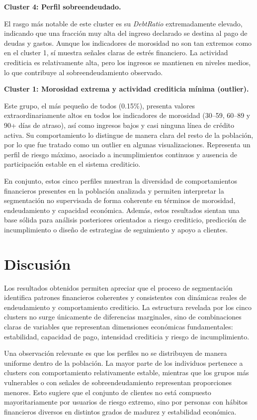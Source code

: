 \documentclass[a4paper,12pt]{article}
\begin{document}
\textbf{Cluster 4: Perfil sobreendeudado.}  

El rasgo más notable de este cluster es su \textit{DebtRatio} extremadamente elevado, indicando que una 
fracción muy alta del ingreso declarado se destina al pago de deudas y gastos. Aunque los indicadores de 
morosidad no son tan extremos como en el cluster 1, sí muestra señales claras de estrés financiero. La 
actividad crediticia es relativamente alta, pero los ingresos se mantienen en niveles medios, lo que 
contribuye al sobreendeudamiento observado.

\textbf{Cluster 1: Morosidad extrema y actividad crediticia mínima (outlier).} 

Este grupo, el más pequeño de todos (0.15\%), presenta valores extraordinariamente altos en todos 
los indicadores de morosidad (30--59, 60--89 y 90+ días de atraso), así como ingresos bajos y casi 
ninguna línea de crédito activa. Su comportamiento lo distingue de manera clara del resto de la población, 
por lo que fue tratado como un outlier en algunas visualizaciones. Representa un perfil de riesgo máximo, 
asociado a incumplimientos continuos y ausencia de participación estable en el sistema crediticio.

En conjunto, estos cinco perfiles muestran la diversidad de comportamientos financieros presentes en 
la población analizada y permiten interpretar la segmentación no supervisada de forma coherente en términos 
de morosidad, endeudamiento y capacidad económica. Además, estos resultados sientan una base sólida para 
análisis posteriores orientados a riesgo crediticio, predicción de incumplimiento o diseño de estrategias 
de seguimiento y apoyo a clientes.

\section{Discusión}

Los resultados obtenidos permiten apreciar que el proceso de segmentación identifica patrones financieros 
coherentes y consistentes con dinámicas reales de endeudamiento y comportamiento crediticio. La estructura 
revelada por los cinco clusters no surge únicamente de diferencias marginales, sino de combinaciones claras 
de variables que representan dimensiones económicas fundamentales: estabilidad, capacidad de pago, intensidad 
crediticia y riesgo de incumplimiento.

Una observación relevante es que los perfiles no se distribuyen de manera uniforme dentro de la población. 
La mayor parte de los individuos pertenece a clusters con comportamiento relativamente estable, mientras 
que los grupos más vulnerables o con señales de sobreendeudamiento representan proporciones menores. Esto 
sugiere que el conjunto de clientes no está compuesto mayoritariamente por usuarios de riesgo extremo, 
sino por personas con hábitos financieros diversos en distintos grados de madurez y estabilidad económica.
\end{document}

